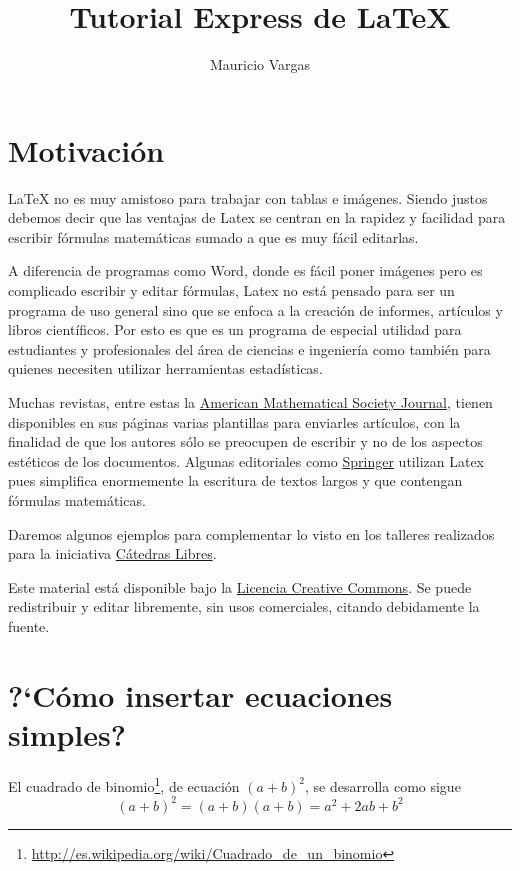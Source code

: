 \documentclass[letterpaper,twoside]{article}
\title{Tutorial Express de \LaTeX}
\author{Mauricio Vargas}
\begin{document}
\maketitle
\tableofcontents

\section{Motivaci\'on}

\LaTeX\: no es muy amistoso para trabajar con tablas e im\'agenes. Siendo justos debemos decir que las ventajas de Latex se centran en la rapidez y facilidad para escribir f\'ormulas matem\'aticas sumado a que es muy f\'acil editarlas. 

A diferencia de programas como Word, donde es f\'acil poner im\'agenes pero es complicado escribir y editar f\'ormulas, Latex no est\'a pensado para ser un programa de uso general sino que se enfoca a la creaci\'on de informes, art\'iculos y libros cient\'ificos. Por esto es que es un programa de especial utilidad para estudiantes y profesionales del \'area de ciencias e ingenier\'ia como tambi\'en para quienes necesiten utilizar herramientas estad\'isticas.

Muchas revistas, entre estas la \href{http://www.ams.org/home/page}{American Mathematical Society Journal}, tienen disponibles en sus p\'aginas varias plantillas para enviarles art\'iculos, con la finalidad de que los autores s\'olo se preocupen de escribir y no de los aspectos est\'eticos de los documentos. Algunas editoriales como \href{http://www.ams.org/home/page}{Springer} utilizan Latex pues simplifica enormemente la escritura de textos largos y que contengan f\'ormulas matem\'aticas.

Daremos algunos ejemplos para complementar lo visto en los talleres realizados para la iniciativa \href{https://www.facebook.com/catedraslibres?fref=ts}{C\'atedras Libres}.

Este material est\'a disponible bajo la \href{http://creativecommons.org/licenses/by-nc/3.0/}{Licencia Creative Commons}. Se puede redistribuir y editar libremente, sin usos comerciales, citando debidamente la fuente.

\newpage

\section{?`C\'omo insertar ecuaciones simples?}

El cuadrado de binomio\footnote{\quad \url{http://es.wikipedia.org/wiki/Cuadrado_de_un_binomio}}, de ecuaci\'on $(a+b)^2$, se desarrolla como sigue 
$$(a+b)^2 = (a+b)(a+b) = a^2 + 2ab + b^2$$
\end{document}
